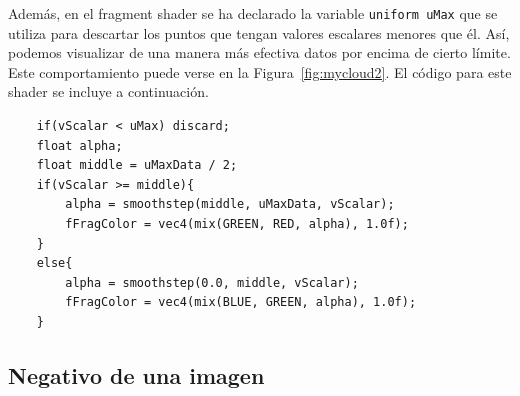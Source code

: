 Además, en el fragment shader se ha declarado la variable \verb|uniform uMax|
que se utiliza para descartar los puntos que tengan valores escalares menores
que él. Así, podemos visualizar de una manera  más efectiva datos por encima de
cierto límite. Este comportamiento puede verse en la Figura~\ref{fig:mycloud2}.
El código para este shader se incluye a continuación.

\begin{verbatim}
    if(vScalar < uMax) discard;	
    float alpha;
    float middle = uMaxData / 2;
    if(vScalar >= middle){
        alpha = smoothstep(middle, uMaxData, vScalar);
        fFragColor = vec4(mix(GREEN, RED, alpha), 1.0f);
    }
    else{
        alpha = smoothstep(0.0, middle, vScalar);
        fFragColor = vec4(mix(BLUE, GREEN, alpha), 1.0f);
    }
\end{verbatim}

\subsection{Negativo de una imagen}
\label{makereference5.5.6}


